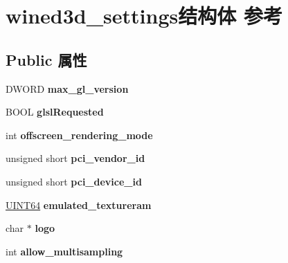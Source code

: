 \hypertarget{structwined3d__settings}{}\section{wined3d\+\_\+settings结构体 参考}
\label{structwined3d__settings}
\subsection*{Public 属性}
\begin{DoxyCompactItemize}
\item 
\mbox{\label{structwined3d__settings_a99b760711336cb05b575a250b2c27888}} 
D\+W\+O\+RD {\bfseries max\+\_\+gl\+\_\+version}
\item 
\mbox{\label{structwined3d__settings_ad77f30a02f3ad91514b3281c602275be}} 
B\+O\+OL {\bfseries glsl\+Requested}
\item 
\mbox{\label{structwined3d__settings_a6db2fa8db2762a623b4eebe5a5c85b9e}} 
int {\bfseries offscreen\+\_\+rendering\+\_\+mode}
\item 
\mbox{\label{structwined3d__settings_ac2c4d0be4cffa3eb88e535ace175059b}} 
unsigned short {\bfseries pci\+\_\+vendor\+\_\+id}
\item 
\mbox{\label{structwined3d__settings_aec73e587fbd09a2e04a44c17ab04bd7e}} 
unsigned short {\bfseries pci\+\_\+device\+\_\+id}
\item 
\mbox{\label{structwined3d__settings_ad6b8586aca933ea562576529032c8b45}} 
\hyperlink{_processor_bind_8h_a57be03562867144161c1bfee95ca8f7c}{U\+I\+N\+T64} {\bfseries emulated\+\_\+textureram}
\item 
\mbox{\label{structwined3d__settings_ab0d862687576e8a4ddac8601232ec025}} 
char $\ast$ {\bfseries logo}
\item 
\mbox{\label{structwined3d__settings_a6fdd550c5999b9da33b9a28f35327d9f}} 
int {\bfseries allow\+\_\+multisampling}
\item 
\mbox{\label{structwined3d__settings_af6c11d66bf9fed0f6bc4aff9f4988971}} 

\end{DoxyCompactItemize}
